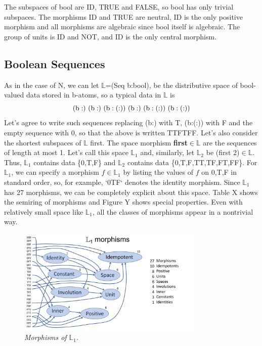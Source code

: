\documentclass[11pt]{article}
\begin{document}
The subspaces of bool are ID, TRUE and FALSE, so bool has only trivial subspaces.  The morphisms ID and TRUE are neutral, ID is the only positive 
morphism and all morphisms are algebraic since bool itself is algebraic.  The group of units is ID and NOT, and ID is the only central morphism. 

\subsection{Boolean Sequences}

As in the case of N, we can let $\mathbb L$=(Seq b:bool), be the distributive space of bool-valued data stored in b-atoms, so a typical data in $\mathbb L$ is 
\begin{equation}
{\rm (b:)\ (b:)\ (b:(:))\ (b:)\ (b:(:))\ (b:(:))}
\end{equation}
Let's agree to write such sequences replacing (b:) with T, (b:(:)) with F and the empty sequence with 0, so that the above is written TTFTFF.   
Let's also consider the shortest subspaces of $\mathbb L$ first.  The space morphism {\bf first}$\in\mathbb L$ are the sequences of length at most 1.  
Let's call this space ${\mathbb L}_1$ and, similarly, let ${\mathbb L}_2$ be (first 2)$\in\mathbb L$.  
Thus, ${\mathbb L}_1$ contains data \{0,T,F\} and ${\mathbb L}_2$ contains data \{0,T,F,TT,TF,FT,FF\}. 
For ${\mathbb L}_1$, we can specify a morphism $f\in {\mathbb L}_1$ by listing the values of $f$ on 0,T,F in standard order, so, for example, `0TF` denotes the identity morphism. 
Since ${\mathbb L}_1$ has 27 morphisms, we can be completely explicit about this space.  Table X shows the semiring of morphisms and Figure Y shows special 
properties.  Even with relatively small space like ${\mathbb L}_1$, all the classes of morphisms appear in a nontrivial way.

\begin{figure}[h]
\centering
\includegraphics[width=0.8\textwidth]{L1.pdf}
\caption{{\it Morphisms of ${\mathbb L}_1$.}}
\end{figure}
\end{document}
